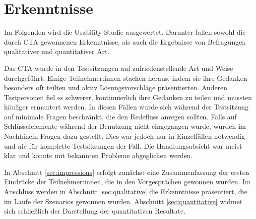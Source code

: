 \section{Erkenntnisse}

Im Folgenden wird die Usability-Studie ausgewertet. Darunter fallen sowohl die durch \acs{CTA} gewonnenen Erkenntnisse, als auch die Ergebnisse von Befragungen qualitativer und quantitativer Art.

Das \ac{CTA} wurde in den Testsitzungen auf zufriedenstellende Art und Weise durchgeführt. Einige Teilnehmer:innen stachen heraus, indem sie ihre Gedanken besonders oft teilten und aktiv Lösungsvorschläge präsentierten. Anderen Testpersonen fiel es schwerer, kontinuierlich ihre Gedanken zu teilen und mussten häufiger ermuntert werden. In diesen Fällen wurde sich während der Testsitzung auf minimale Fragen beschränkt, die den Redefluss anregen sollten. Falls auf Schlüsselelemente während der Benutzung nicht eingegangen wurde, wurden im Nachhinein Fragen dazu gestellt. Dies war jedoch nur in Einzelfällen notwendig und nie für komplette Testsitzungen der Fall. Die Handlungsabsicht war meist klar und konnte mit bekannten Probleme abgeglichen werden.

In Abschnitt \ref{sec:impressions} erfolgt zunächst eine Zusammenfassung der ersten Eindrücke der Teilnehmer:innen, die in den Vorgesprächen gewonnen wurden. Im Anschluss werden in Abschnitt \ref{sec:qualitative} die Erkenntnisse präsentiert, die im Laufe der Szenarios gewonnen wurden. Abschnitt \ref{sec:quantitative} widmet sich schließlich der Darstellung der quantitativen Resultate.
